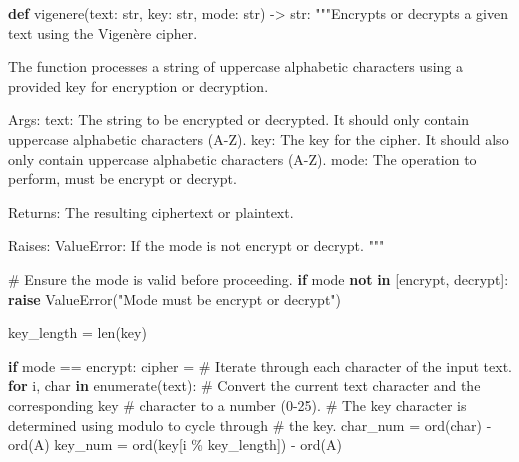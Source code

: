 \documentclass[
  nswissgerman,
  a4paper,
  DIV=11,
  numbers=noendperiod,
  ngerman]{scrreprt}
\newenvironment{Shaded}{\begin{snugshade}}{\end{snugshade}}
\newcommand{\BuiltInTok}[1]{\textcolor[rgb]{0.00,0.23,0.31}{#1}}
\newcommand{\CommentTok}[1]{\textcolor[rgb]{0.37,0.37,0.37}{#1}}
\newcommand{\ControlFlowTok}[1]{\textcolor[rgb]{0.00,0.23,0.31}{\textbf{#1}}}
\newcommand{\KeywordTok}[1]{\textcolor[rgb]{0.00,0.23,0.31}{\textbf{#1}}}
\newcommand{\NormalTok}[1]{\textcolor[rgb]{0.00,0.23,0.31}{#1}}
\newcommand{\OperatorTok}[1]{\textcolor[rgb]{0.37,0.37,0.37}{#1}}
\newcommand{\PreprocessorTok}[1]{\textcolor[rgb]{0.68,0.00,0.00}{#1}}
\newcommand{\StringTok}[1]{\textcolor[rgb]{0.13,0.47,0.30}{#1}}
\begin{document}
\begin{Shaded}
\begin{Highlighting}[numbers=left,,]
\KeywordTok{def}\NormalTok{ vigenere(text: }\BuiltInTok{str}\NormalTok{, key: }\BuiltInTok{str}\NormalTok{, mode: }\BuiltInTok{str}\NormalTok{) }\OperatorTok{{-}\textgreater{}} \BuiltInTok{str}\NormalTok{:}
    \CommentTok{"""Encrypts or decrypts a given text using the Vigenère cipher.}

\CommentTok{    The function processes a string of uppercase alphabetic characters}
\CommentTok{    using a provided key for encryption or decryption.}

\CommentTok{    Args:}
\CommentTok{        text: The string to be encrypted or decrypted. It should only contain}
\CommentTok{              uppercase alphabetic characters (A{-}Z).}
\CommentTok{        key: The key for the cipher. It should also only contain}
\CommentTok{             uppercase alphabetic characters (A{-}Z).}
\CommentTok{        mode: The operation to perform, must be \textquotesingle{}encrypt\textquotesingle{} or \textquotesingle{}decrypt\textquotesingle{}.}

\CommentTok{    Returns:}
\CommentTok{        The resulting ciphertext or plaintext.}

\CommentTok{    Raises:}
\CommentTok{        ValueError: If the mode is not \textquotesingle{}encrypt\textquotesingle{} or \textquotesingle{}decrypt\textquotesingle{}.}
\CommentTok{    """}

    \CommentTok{\# Ensure the mode is valid before proceeding.}
    \ControlFlowTok{if}\NormalTok{ mode }\KeywordTok{not} \KeywordTok{in}\NormalTok{ [}\StringTok{\textquotesingle{}encrypt\textquotesingle{}}\NormalTok{, }\StringTok{\textquotesingle{}decrypt\textquotesingle{}}\NormalTok{]:}
        \ControlFlowTok{raise} \PreprocessorTok{ValueError}\NormalTok{(}\StringTok{"Mode must be \textquotesingle{}encrypt\textquotesingle{} or \textquotesingle{}decrypt\textquotesingle{}"}\NormalTok{)}
    
\NormalTok{    key\_length }\OperatorTok{=} \BuiltInTok{len}\NormalTok{(key)}
    
    \ControlFlowTok{if}\NormalTok{ mode }\OperatorTok{==} \StringTok{\textquotesingle{}encrypt\textquotesingle{}}\NormalTok{:}
\NormalTok{       cipher }\OperatorTok{=} \StringTok{\textquotesingle{}\textquotesingle{}}
       \CommentTok{\# Iterate through each character of the input text.}
       \ControlFlowTok{for}\NormalTok{ i, char }\KeywordTok{in} \BuiltInTok{enumerate}\NormalTok{(text):}
           \CommentTok{\# Convert the current text character and the corresponding key }
           \CommentTok{\# character to a number (0{-}25).}
           \CommentTok{\# The key character is determined using modulo to cycle through }
           \CommentTok{\# the key.}
\NormalTok{           char\_num }\OperatorTok{=} \BuiltInTok{ord}\NormalTok{(char) }\OperatorTok{{-}} \BuiltInTok{ord}\NormalTok{(}\StringTok{\textquotesingle{}A\textquotesingle{}}\NormalTok{)}
\NormalTok{           key\_num }\OperatorTok{=} \BuiltInTok{ord}\NormalTok{(key[i }\OperatorTok{\%}\NormalTok{ key\_length]) }\OperatorTok{{-}} \BuiltInTok{ord}\NormalTok{(}\StringTok{\textquotesingle{}A\textquotesingle{}}\NormalTok{)}
           

\end{Highlighting}
\end{Shaded}
\end{document}
